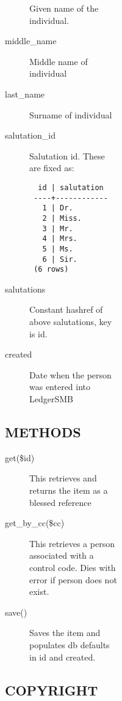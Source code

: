 \begin{description}
\begin{description}
\begin{description}
\begin{description}
\begin{description}
\begin{description}
\begin{description}
\begin{description}
\begin{description}
Given name of the individual.


\item[{middle\_name}] \mbox{}

Middle name of individual


\item[{last\_name}] \mbox{}

Surname of individual


\item[{salutation\_id}] \mbox{}

Salutation id.  These are fixed as:

\begin{verbatim}
  id | salutation 
 ----+------------
   1 | Dr.
   2 | Miss.
   3 | Mr.
   4 | Mrs.
   5 | Ms.
   6 | Sir.
 (6 rows)
\end{verbatim}

\item[{salutations}] \mbox{}

Constant hashref of above salutations, key is id.


\item[{created}] \mbox{}

Date when the  person was entered into LedgerSMB

\end{description}
\subsection*{METHODS\label{LedgerSMB::DBObject::Entity::Person_-_-_Natural_Person_handling_for_LedgerSMB_METHODS}}
\begin{description}

\item[{get(\$id)}] \mbox{}

This retrieves and returns the item as a blessed reference


\item[{get\_by\_cc(\$cc)}] \mbox{}

This retrieves a person associated with a control code.  Dies with error if 
person does not exist.


\item[{save()}] \mbox{}

Saves the item and populates db defaults in id and created.

\end{description}
\subsection*{COPYRIGHT\label{LedgerSMB::DBObject::Entity::Person_-_-_Natural_Person_handling_for_LedgerSMB_COPYRIGHT}}



\end{description}
\end{description}
\end{description}
\end{description}
\end{description}
\end{description}
\end{description}
\end{description}
